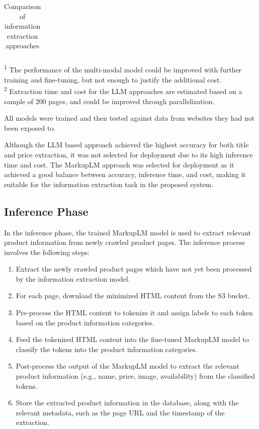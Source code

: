 \begin{table}[h]
\begin{tabularx}{\textwidth}{p{4cm} p{2.1cm} p{2.1cm} X X}
        \bottomrule
    \end{tabularx}
    \par\vspace{0.4em}
    \raggedright\footnotesize
    \textsuperscript{1} The performance of the multi-modal model could be improved with further training and fine-tuning, but not enough to justify the additional cost.\\
    \textsuperscript{2} Extraction time and cost for the LLM approaches are estimated based on a sample of 200 pages, and could be improved through parallelization.
    \caption{Comparison of information extraction approaches}
    \label{tab:information_extraction_results}
\end{table}

\noindent All models were trained and then tested against data from websites they had not been exposed to.

Although the LLM based approach achieved the highest accuracy for both title and price extraction, it was not selected for deployment due to its high inference time and cost.
The MarkupLM approach was selected for deployment as it achieved a good balance between accuracy, inference time, and cost, making it suitable for the information extraction task in the proposed system.

\subsection{Inference Phase}\label{subsec:information_extraction_inference_phase}
In the inference phase, the trained MarkupLM model is used to extract relevant product information from newly crawled product pages.
The inference process involves the following steps:
\begin{enumerate}
    \item Extract the newly crawled product pages which have not yet been processed by the information extraction model.
    \item For each page, download the minimized HTML content from the S3 bucket.
    \item Pre-process the HTML content to tokenize it and assign labels to each token based on the product information categories.
    \item Feed the tokenized HTML content into the fine-tuned MarkupLM model to classify the tokens into the product information categories.
    \item Post-process the output of the MarkupLM model to extract the relevant product information (e.g., name, price, image, availability) from the classified tokens.
    \item Store the extracted product information in the database, along with the relevant metadata, such as the page URL and the timestamp of the extraction.
\end{enumerate}

